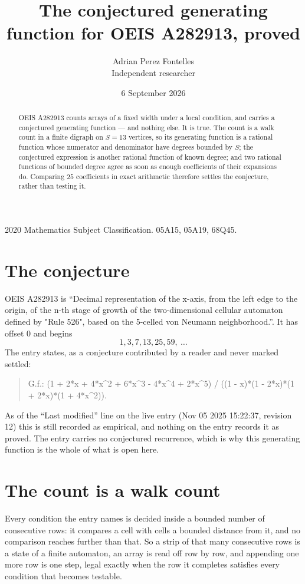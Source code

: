 \documentclass[11pt,a4paper]{article}
\title{The conjectured generating function for OEIS A282913, proved}
\author{Adrian Perez Fontelles\\ \small Independent researcher}
\date{6 September 2026}
\theoremstyle{plain}
\theoremstyle{definition}
\begin{document}
\maketitle

\begin{abstract}
OEIS A282913 counts arrays of a fixed width under a local condition, and carries a conjectured
generating function --- and nothing else. It is true. The count is a walk count in a finite
digraph on $S=13$ vertices, so its generating function is a rational function whose numerator
and denominator have degrees bounded by $S$; the conjectured expression is another rational
function of known degree; and two rational functions of bounded degree agree as soon as enough
coefficients of their expansions do. Comparing $25$ coefficients in exact arithmetic
therefore settles the conjecture, rather than testing it.
\end{abstract}

\noindent\small 2020 Mathematics Subject Classification. 05A15, 05A19, 68Q45.\normalsize

\section{The conjecture}

OEIS A282913 is ``Decimal representation of the x-axis, from the left edge to the origin, of the n-th stage of growth of the two-dimensional cellular automaton defined by "Rule 526", based on the 5-celled von Neumann neighborhood.''. It has offset $0$ and begins
\[
1, 3, 7, 13, 25, 59,\ \dots
\]
The entry states, as a conjecture contributed by a reader and never marked settled:
\begin{quote}
G.f.: (1 + 2*x + 4*x\^{}2 + 6*x\^{}3 - 4*x\^{}4 + 2*x\^{}5) / ((1 - x)*(1 - 2*x)*(1 + 2*x)*(1 + 4*x\^{}2)).
\end{quote}
As of the ``Last modified'' line on the live entry (Nov 05 2025 15:22:37, revision 12) this is still
recorded as empirical, and nothing on the entry records it as proved. The entry carries no
conjectured recurrence, which is why this generating function is the whole of what is open
here.

\section{The count is a walk count}

Every condition the entry names is decided inside a bounded number of consecutive rows: it
compares a cell with cells a bounded distance from it, and no comparison reaches further than
that. So a strip of that many consecutive rows is a state of a finite automaton, an array is
read off row by row, and appending one more row is one step, legal exactly when the row it
completes satisfies every condition that becomes testable.
\end{document}
